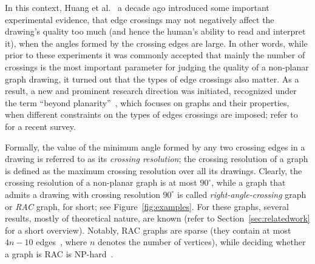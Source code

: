 \documentclass[runningheads]{llncs}
\begin{document}
In this context, Huang et al.~\cite{DBLP:conf/apvis/Huang07,DBLP:journals/vlc/HuangEH14} a decade ago introduced some important experimental evidence,
that edge crossings may not negatively affect the drawing's quality too much (and hence the human's ability to read and interpret it), when the angles formed by the crossing edges are large. In other words, while prior to these experiments it was commonly accepted that mainly the number of crossings is the most important parameter for judging the quality of a non-planar graph drawing, it turned out that the types of edge crossings also matter. As a result, a new and prominent research direction was initiated, recognized under the term ``beyond planarity''~\cite{Shonan2016,Dagstuhl2016,SoCG2017}, which focuses on graphs and their properties, when different constraints on the types of edges crossings are imposed; refer to~\cite{DBLP:journals/corr/abs-1804-07257} for a recent survey.

Formally, the value of the minimum angle formed by any two crossing edges in a drawing is referred to as its \emph{crossing resolution}; the crossing resolution of a graph is defined as the maximum crossing resolution over all its drawings. Clearly, the crossing resolution of a non-planar graph is at most $90^\circ$, while a graph that admits a drawing with crossing resolution $90^\circ$ is called \emph{right-angle-crossing} graph or \emph{RAC} graph, for short; see Figure~\ref{fig:examples}. For these graphs, several results, mostly of theoretical nature, are known (refer to Section~\ref{sec:relatedwork} for a short overview). Notably, RAC graphs are sparse (they contain at most $4n-10$ edges~\cite{DBLP:journals/tcs/DidimoEL11}, where $n$ denotes the number of  vertices), while deciding whether a graph is RAC is NP-hard~\cite{DBLP:journals/jgaa/ArgyriouBS12}.
\end{document}
